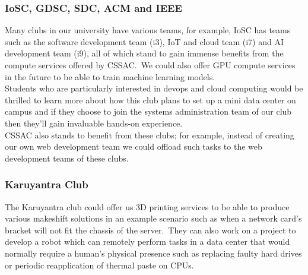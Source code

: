 \documentclass[11pt,twocolumn,oneside]{book}
\begin{document}
    \subsubsection{IoSC, GDSC, SDC, ACM and IEEE}
    Many clubs in our university have various teams, for example, IoSC has teams such as the software development team
    (i3), IoT and cloud team (i7) and AI development team (i9), all of which stand to gain immense benefits from the
    compute services offered by CSSAC.\ We could also offer GPU compute services in the future to be able to train
    machine learning models.
    \\
    Students who are particularly interested in devops and cloud computing would be thrilled to learn more
    about how this club plans to set up a mini data center on campus and if they choose to join the systems
    administration team of our club then they'll gain invaluable hands-on experience.
    \\
    CSSAC also stands to benefit from these clubs; for example, instead of creating our own web development team we
    could offload such tasks to the web development teams of these clubs\@.

    \subsubsection{Karuyantra Club}
    The Karuyantra club could offer us 3D printing services to be able to produce various makeshift solutions in an
    example scenario such as when a network card's bracket will not fit the chassis of the server.\ They can also
    work on a project to develop a robot which can remotely perform tasks in a data center that would normally require a
    human's physical presence such as replacing faulty hard drives or periodic reapplication of thermal paste on CPUs.
\end{document}

